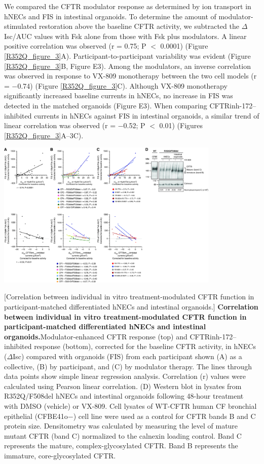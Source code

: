 We compared the CFTR modulator response as determined by ion transport in hNECs and FIS in intestinal organoids. To determine the amount of modulator-stimulated restoration above the baseline CFTR activity, we subtracted the $\Delta$Isc/AUC values with Fsk alone from those with Fsk plus modulators. A linear positive correlation was observed (r = 0.75; P $<$ 0.0001) (Figure \ref{R352Q_figure_3}A). Participant-to-participant variability was evident (Figure \ref{R352Q_figure_3}B, Figure E3). Among the modulators, an inverse correlation was observed in response to VX-809 monotherapy between the two cell models (r = −0.74) (Figure \ref{R352Q_figure_3}C). Although VX-809 monotherapy significantly increased baseline currents in hNECs, no increase in FIS was detected in the matched organoids (Figure E3). When comparing CFTRinh-172–inhibited currents in hNECs against FIS in intestinal organoids, a similar trend of linear correlation was observed (r = −0.52; P $<$ 0.01) (Figures \ref{R352Q_figure_3}A–3C).

\begin{center}
	\includegraphics[width=0.80\textwidth]{figures/R352Q/figure_3.jpg}
\end{center}
\begingroup
{}[Correlation between individual in vitro treatment-modulated CFTR function in participant-matched differentiated hNECs and intestinal organoids.] {\textbf{Correlation between individual in vitro treatment-modulated CFTR function in participant-matched differentiated hNECs and intestinal organoids.}}{Modulator-enhanced CFTR response (top) and CFTRinh-172–inhibited response (bottom), corrected for the baseline CFTR activity, in hNECs ($\Delta$Isc) compared with organoids (FIS) from each participant shown (A) as a collective, (B) by participant, and (C) by modulator therapy. The lines through data points show simple linear regression analysis. Correlation (r) values were calculated using Pearson linear correlation. (D) Western blot in lysates from R352Q/F508del hNECs and intestinal organoids following 48-hour treatment with DMSO (vehicle) or VX-809. Cell lysates of WT-CFTR human CF bronchial epithelial (CFBE41o−) cell line were used as a control for CFTR bands B and C protein size. Densitometry was calculated by measuring the level of mature mutant CFTR (band C) normalized to the calnexin loading control. Band C represents the mature, complex-glycosylated CFTR. Band B represents the immature, core-glycosylated CFTR.}
\label{R352Q_figure_3}
\endgroup

